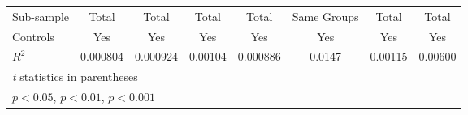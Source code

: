 {\begin{tabular}{l*{7}{c}}
Sub-sample      &    Total         &    Total         &    Total         &    Total         &Same Groups         &    Total         &    Total         \\
Controls        &      Yes         &      Yes         &      Yes         &      Yes         &      Yes         &      Yes         &      Yes         \\
$ R^2 $         & 0.000804         & 0.000924         &  0.00104         & 0.000886         &   0.0147         &  0.00115         &  0.00600         \\
\hline\hline
\multicolumn{8}{l}{\footnotesize \textit{t} statistics in parentheses}\\
\multicolumn{8}{l}{\footnotesize \sym{*} \(p<0.05\), \sym{**} \(p<0.01\), \sym{***} \(p<0.001\)}\\
\end{tabular}
}
